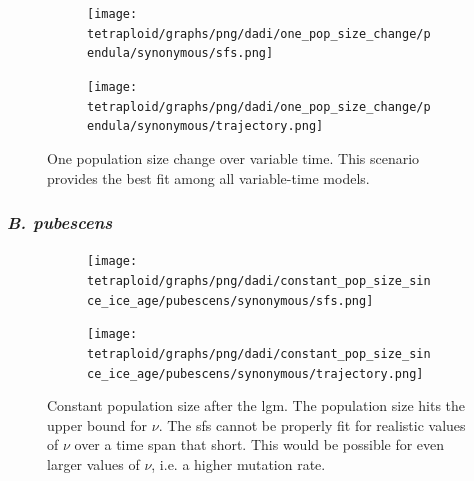 \documentclass[hidelinks,11pt]{article}
\newcommand{\pubescens}{\textit{B. pubescens}}
\begin{document}
    \begin{figure}[H]
        \centering
        \begin{subfigure}[b]{0.465\textwidth}
            \texttt{[image: tetraploid/graphs/png/dadi/one\_pop\_size\_change/pendula/synonymous/sfs.png]}
        \end{subfigure}
        \hfill
        \begin{subfigure}[b]{0.525\textwidth}
            \texttt{[image: tetraploid/graphs/png/dadi/one\_pop\_size\_change/pendula/synonymous/trajectory.png]}
        \end{subfigure}
        \caption{One population size change over variable time. This scenario provides the best fit among all variable-time models.}
        \label{fig:one_pop_size_change_pendula}
    \end{figure}

    \subsubsection{\pubescens{}}

    \begin{figure}[H]
        \centering
        \begin{subfigure}[b]{0.465\textwidth}
            \texttt{[image: tetraploid/graphs/png/dadi/constant\_pop\_size\_since\_ice\_age/pubescens/synonymous/sfs.png]}
        \end{subfigure}
        \hfill
        \begin{subfigure}[b]{0.525\textwidth}
            \texttt{[image: tetraploid/graphs/png/dadi/constant\_pop\_size\_since\_ice\_age/pubescens/synonymous/trajectory.png]}
        \end{subfigure}
        \caption{Constant population size after the \acrshort{lgm}. The population size hits the upper bound for $\nu$. The \acrshort{sfs} cannot be properly fit for realistic values of $\nu$ over a time span that short. This would be possible for even larger values of $\nu$, i.e. a higher mutation rate.}
        \label{fig:constant_pop_size_since_ice_age_pubescens}
    \end{figure}
\end{document}
